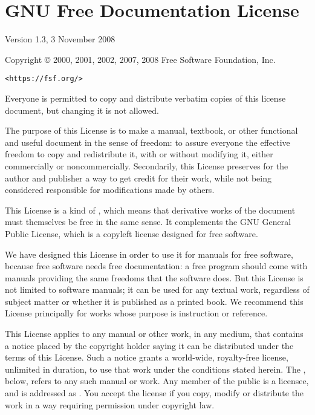 \chapter{GNU Free Documentation License}

\startalignment [middle]

       Version 1.3, 3 November 2008


 Copyright \copyright{} 2000, 2001, 2002, 2007, 2008  Free Software Foundation, Inc.

 \bigskip

     {\tt <https://fsf.org/>}

 \bigskip

 Everyone is permitted to copy and distribute verbatim copies
 of this license document, but changing it is not allowed.
\stopalignment


\stopalignment

The purpose of this License is to make a manual, textbook, or other
functional and useful document  in the sense of freedom: to
assure everyone the effective freedom to copy and redistribute it,
with or without modifying it, either commercially or noncommercially.
Secondarily, this License preserves for the author and publisher a way
to get credit for their work, while not being considered responsible
for modifications made by others.

This License is a kind of , which means that derivative
works of the document must themselves be free in the same sense.  It
complements the GNU General Public License, which is a copyleft
license designed for free software.

We have designed this License in order to use it for manuals for free
software, because free software needs free documentation: a free
program should come with manuals providing the same freedoms that the
software does.  But this License is not limited to software manuals;
it can be used for any textual work, regardless of subject matter or
whether it is published as a printed book.  We recommend this License
principally for works whose purpose is instruction or reference.


\stopalignment

This License applies to any manual or other work, in any medium, that
contains a notice placed by the copyright holder saying it can be
distributed under the terms of this License.  Such a notice grants a
world-wide, royalty-free license, unlimited in duration, to use that
work under the conditions stated herein.  The , below,
refers to any such manual or work.  Any member of the public is a
licensee, and is addressed as .  You accept the license if you
copy, modify or distribute the work in a way requiring permission
under copyright law.

